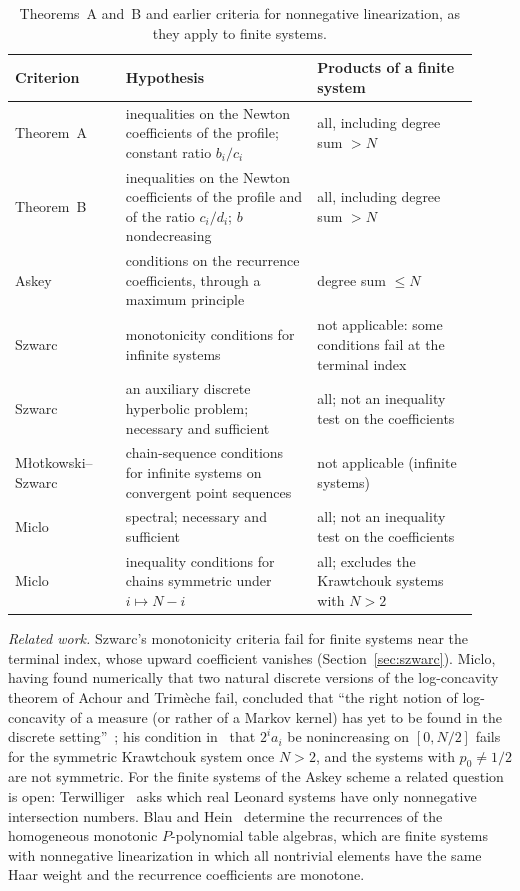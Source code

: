 \begin{table}[!t]
\centering
\caption{Theorems~A and~B and earlier criteria for nonnegative linearization, as they apply to finite systems.}\label{tab:compare}
\renewcommand{\arraystretch}{1.15}
\begin{tabular}{@{}>{\raggedright\arraybackslash}p{0.22\linewidth}>{\raggedright\arraybackslash}p{0.38\linewidth}>{\raggedright\arraybackslash}p{0.32\linewidth}@{}}
Criterion & Hypothesis & Products of a finite system\\\hline
Theorem~A & inequalities on the Newton coefficients of the profile; constant ratio $b_i/c_i$ & all, including degree sum $>N$\\
Theorem~B & inequalities on the Newton coefficients of the profile and of the ratio $c_i/d_i$; $b$ nondecreasing & all, including degree sum $>N$\\
Askey~\cite[Part~II]{askey} & conditions on the recurrence coefficients, through a maximum principle & degree sum $\leq N$\\
Szwarc~\cite[Thms.~3.2, 3.3]{szwarc} & monotonicity conditions for infinite systems & not applicable: some conditions fail at the terminal index\\
Szwarc~\cite[Thm.~1]{szwarc2003} & an auxiliary discrete hyperbolic problem; necessary and sufficient & all; not an inequality test on the coefficients\\
M{\l}otkowski--Szwarc~\cite{mlotszwarc} & chain-sequence conditions for infinite systems on convergent point sequences & not applicable (infinite systems)\\
Miclo~\cite[Prop.~3.3]{miclo} & spectral; necessary and sufficient & all; not an inequality test on the coefficients\\
Miclo~\cite[Thm.~31]{miclo2019} & inequality conditions for chains symmetric under $i\mapsto N-i$ & all; excludes the Krawtchouk systems with $N>2$
\end{tabular}
\end{table}

\emph{Related work.} Szwarc's monotonicity criteria fail for finite systems near the terminal index, whose upward coefficient vanishes (Section~\ref{sec:szwarc}). Miclo, having found numerically that two natural discrete versions of the log-concavity theorem of Achour and Trim\`eche fail, concluded that ``the right notion of log-concavity of a measure (or rather of a Markov kernel) has yet to be found in the discrete setting''~\cite[p.~433]{miclo}; his condition in~\cite[Theorem~31]{miclo2019} that $2^ia_i$ be nonincreasing on $[0,N/2]$ fails for the symmetric Krawtchouk system once $N>2$, and the systems with $p_0\neq1/2$ are not symmetric. For the finite systems of the Askey scheme a related question is open: Terwilliger~\cite[Problem~36.4]{terwilliger} asks which real Leonard systems have only nonnegative intersection numbers. Blau and Hein~\cite[Theorem~1.1]{blauhein} determine the recurrences of the homogeneous monotonic $P$-polynomial table algebras, which are finite systems with nonnegative linearization in which all nontrivial elements have the same Haar weight and the recurrence coefficients are monotone.

